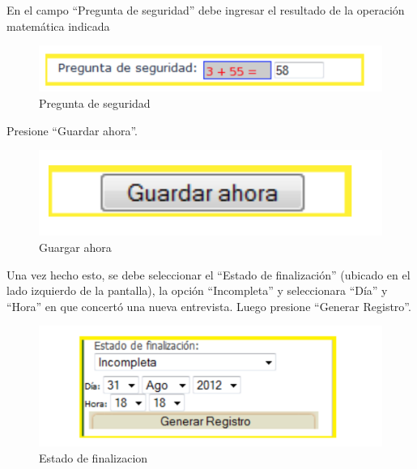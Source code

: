 \documentclass[
  openany]{book}
\begin{document}
En el campo ``Pregunta de seguridad'' debe ingresar el resultado de la operación matemática indicada

\begin{figure}

{\centering \includegraphics[width=1\linewidth]{imagenes/figura6-36} 

}

\caption{Pregunta de seguridad}\label{fig:ennoterminada21}
\end{figure}

Presione ``Guardar ahora''.

\begin{figure}

{\centering \includegraphics[width=1\linewidth]{imagenes/figura6-37} 

}

\caption{Guargar ahora}\label{fig:guard}
\end{figure}

Una vez hecho esto, se debe seleccionar el ``Estado de finalización'' (ubicado en el lado izquierdo de la pantalla), la opción ``Incompleta'' y seleccionara ``Día'' y ``Hora'' en que concertó una nueva entrevista. Luego presione ``Generar Registro''.

\begin{figure}

{\centering \includegraphics[width=1\linewidth]{imagenes/figura6-38} 

}

\caption{Estado de finalizacion}\label{fig:fin}
\end{figure}
\end{document}
